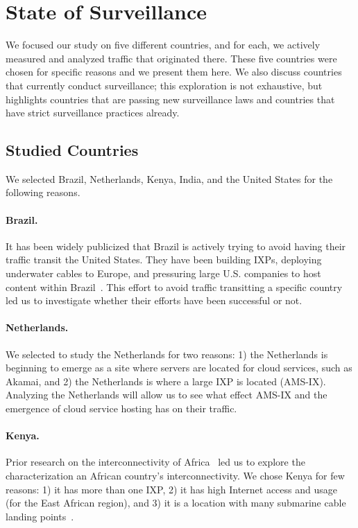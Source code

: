 \section{State of Surveillance}
\label{surv}
We focused our study on five different countries, and for each, we actively measured and analyzed traffic that originated there.  These five countries were chosen for specific reasons and we present them here.  We also discuss countries that currently conduct surveillance; this exploration is not exhaustive, but highlights countries that are passing new surveillance laws and countries that have strict surveillance practices already.   

\subsection{Studied Countries}
We selected Brazil, Netherlands, Kenya, India, and the United States for the following reasons.

\paragraph{Brazil.} It has been widely publicized that Brazil is actively trying to avoid having their traffic transit the United States.  They have been building IXPs, deploying underwater cables to Europe, and pressuring large U.S. companies to host content within Brazil~\cite{brazil_history, brazil_break_from_US, brazil_conference,
  brazil_conference2, brazil_human_rights, brazil_cable, brazil_us_companies, brazil_IXP1}.  This effort to avoid traffic transitting a specific country led us to investigate whether their efforts have been successful or not.

\paragraph{Netherlands.}  We selected to study the Netherlands for two reasons: 1) the Netherlands is beginning to emerge as a site where servers are located for cloud services, such as Akamai, and 2) the Netherlands is where a large IXP is located (AMS-IX). Analyzing the Netherlands will allow us to see what effect AMS-IX and the emergence of cloud service hosting has on their traffic.

\paragraph{Kenya.} Prior research on the interconnectivity of Africa~\cite{gupta2014peering, fanou2015diversity} led us to explore the characterization an African country's interconnectivity.  We chose Kenya for few reasons: 1) it has more than one IXP, 2) it has high Internet access and usage (for the East African region), and 3) it is a location with many submarine cable landing points~\cite{kenya_nigeria, teams}.

